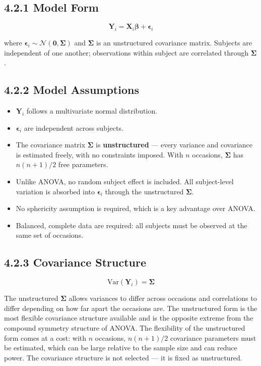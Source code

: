\documentclass[11pt]{article}
\newcommand{\bY}{\mathbf{Y}}
\newcommand{\bX}{\mathbf{X}}
\newcommand{\bbeta}{\boldsymbol{\beta}}
\newcommand{\bepsilon}{\boldsymbol{\epsilon}}
\newcommand{\bSigma}{\boldsymbol{\Sigma}}
\newcommand{\Var}{\mathrm{Var}}
\newcommand{\Normal}{\mathcal{N}}
\begin{document}
\subsection*{4.2.1 Model Form}

$$\bY_i = \bX_i \bbeta + \bepsilon_i$$

where $\bepsilon_i \sim \Normal(\mathbf{0}, \bSigma)$ and $\bSigma$ is an unstructured covariance matrix. Subjects are independent of one another; observations within subject are correlated through $\bSigma$.

\subsection*{4.2.2 Model Assumptions}

\begin{itemize}[leftmargin=2em]
  \item $\bY_i$ follows a multivariate normal distribution.
  \item $\bepsilon_i$ are independent across subjects.
  \item The covariance matrix $\bSigma$ is \textbf{unstructured} --- every variance and covariance is estimated freely, with no constraints imposed. With $n$ occasions, $\bSigma$ has $n(n+1)/2$ free parameters.
  \item Unlike ANOVA, no random subject effect is included. All subject-level variation is absorbed into $\bepsilon_i$ through the unstructured $\bSigma$.
  \item No sphericity assumption is required, which is a key advantage over ANOVA.
  \item Balanced, complete data are required: all subjects must be observed at the same set of occasions.
\end{itemize}

\subsection*{4.2.3 Covariance Structure}

$$\Var(\bY_i) = \bSigma$$

The unstructured $\bSigma$ allows variances to differ across occasions and correlations to differ depending on how far apart the occasions are. The unstructured form is the most flexible covariance structure available and is the opposite extreme from the compound symmetry structure of ANOVA. The flexibility of the unstructured form comes at a cost: with $n$ occasions, $n(n+1)/2$ covariance parameters must be estimated, which can be large relative to the sample size and can reduce power. The covariance structure is not selected --- it is fixed as unstructured.
\end{document}
